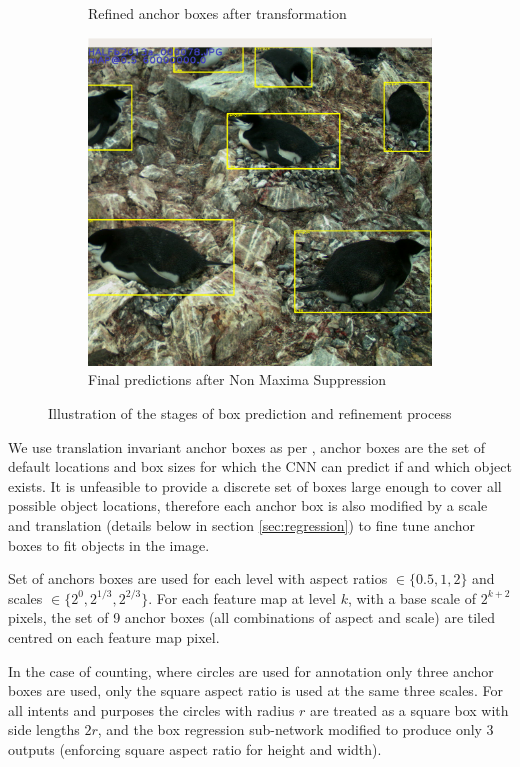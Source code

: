\begin{figure}
\begin{subfigure}[t]{0.33\textwidth}
  \caption{Refined anchor boxes after transformation}
  \end{subfigure}%
  \begin{subfigure}[t]{0.35\textwidth}
  \includegraphics[width=0.95\linewidth]{figures/object/final.png}
  \caption{Final predictions after Non Maxima Suppression}
  \end{subfigure}%
  \caption{Illustration of the stages of box prediction and refinement process}
  \label{fig:anchor_boxes}
\end{figure}


We use translation invariant anchor boxes as per \cite{Wang2017}, anchor boxes are the set of default locations and box sizes for which the \gls{CNN} can predict if and which object exists. It is unfeasible to provide a discrete set of boxes large enough to cover all possible object locations, therefore each anchor box is also modified by a scale and translation (details below in section \ref{sec:regression}) to fine tune anchor boxes to fit objects in the image.

Set of anchors boxes are used for each level with aspect ratios $ \in \{0.5, 1, 2\} $ and scales $ \in \{2^0, 2^{1/3}, 2^{2/3}\} $. For each feature map at level $k$, with a base scale of $ 2^{k + 2} $ pixels, the set of 9 anchor boxes (all combinations of aspect and scale) are tiled centred on each feature map pixel. 

In the case of counting, where circles are used for annotation only three anchor boxes are used, only the square aspect ratio is used at the same three scales. For all intents and purposes the circles with radius $r$ are treated as a square box with side lengths $2r$, and the box regression sub-network modified to produce only $3$ outputs (enforcing square aspect ratio for height and width).


